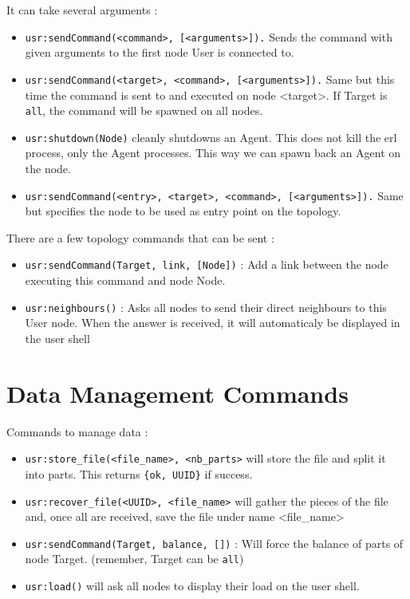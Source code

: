 \documentclass[a4paper,10pt]{report}
\begin{document}
It can take several arguments :

\begin{itemize}
\item \texttt{usr:sendCommand(<command>, [<arguments>]).} Sends the command
with given arguments to the first node User is connected to.
\item \texttt{usr:sendCommand(<target>, <command>, [<arguments>]).} Same 
but this time the command is sent to and executed on node <target>.
If Target is \texttt{all}, the command will be spawned on all nodes.
\item \texttt{usr:shutdown(Node)} cleanly shutdowns an Agent. This
does not kill the erl process, only the Agent processes. This way
we can spawn back an Agent on the node.
\item \texttt{usr:sendCommand(<entry>, <target>, <command>, [<arguments>]).}
Same but specifies the node to be used as entry point on the topology.
\end{itemize}

There are a few topology commands that can be sent :
\begin{itemize}
\item \texttt{usr:sendCommand(Target, link, [Node])} : 
Add a link between the node executing this command and node Node.
\item \texttt{usr:neighbours()} : Asks all nodes to send their direct
neighbours to this User node. When the answer is received, it will
automaticaly be displayed in the user shell
\end{itemize}

\section{Data Management Commands}
Commands to manage data :
\begin{itemize}
\item \texttt{usr:store\_file(<file\_name>, <nb\_parts>} will store the file
and split it into parts. This returns \texttt{\{ok, UUID\}} if success.
\item \texttt{usr:recover\_file(<UUID>, <file\_name>} will gather the pieces
of the file and, once all are received, save the file under name 
<file\_name>
\item \texttt{usr:sendCommand(Target, balance, [])} : Will force the
balance of parts of node Target. (remember, Target can be \texttt{all})
\item \texttt{usr:load()} will ask all nodes to display their load on 
the user shell.
\end{itemize}
\end{document}
